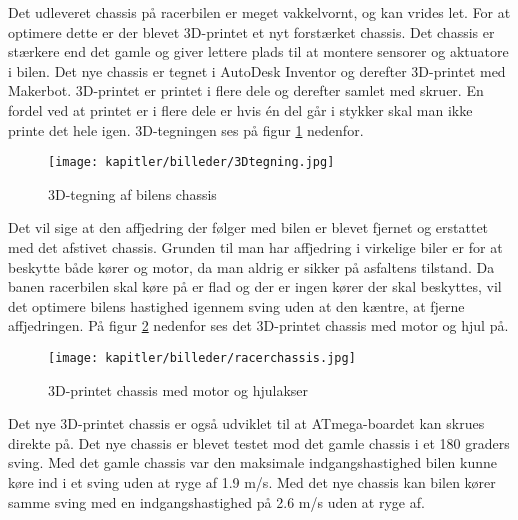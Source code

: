 Det udleveret chassis på racerbilen er meget vakkelvornt, og kan vrides let. For at optimere dette er der blevet 3D-printet et nyt forstærket chassis. Det chassis er stærkere end det gamle og giver lettere plads til at montere sensorer og aktuatore i bilen. Det nye chassis er tegnet i AutoDesk Inventor og derefter 3D-printet med Makerbot. 3D-printet er printet i flere dele og derefter samlet med skruer. En fordel ved at printet er i flere dele er hvis én del går i stykker skal man ikke printe det hele igen. 3D-tegningen ses på figur \ref{fig:3Dtegning} nedenfor.

\begin{figure}[ht]
    \centering
    \texttt{[image: kapitler/billeder/3Dtegning.jpg]}
    \caption{3D-tegning af bilens chassis}
    \label{fig:3Dtegning}
\end{figure}


Det vil sige at den affjedring der følger med bilen er blevet fjernet og erstattet med det afstivet chassis. Grunden til man har affjedring i virkelige biler er for at beskytte både kører og motor, da man aldrig er sikker på asfaltens tilstand. Da banen racerbilen skal køre på er flad og der er ingen kører der skal beskyttes, vil det optimere bilens hastighed igennem sving uden at den kæntre, at fjerne affjedringen. På figur \ref{fig:racerchassis} nedenfor ses det 3D-printet chassis med motor og hjul på.

\begin{figure}[ht]
    \centering
    \texttt{[image: kapitler/billeder/racerchassis.jpg]}
    \caption{3D-printet chassis med motor og hjulakser}
    \label{fig:racerchassis}
\end{figure}

Det nye 3D-printet chassis er også udviklet til at ATmega-boardet kan skrues direkte på. Det nye chassis er blevet testet mod det gamle chassis i et 180 graders sving. Med det gamle chassis var den maksimale indgangshastighed bilen kunne køre ind i et sving uden at ryge af 1.9 m/s. Med det nye chassis kan bilen kører samme sving med en indgangshastighed på 2.6 m/s uden at ryge af. 


